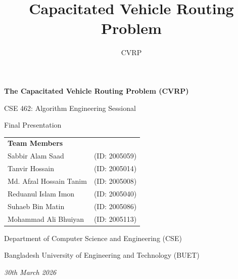 \documentclass{beamer}
\title{Capacitated Vehicle Routing Problem}
\subtitle{CVRP}
\author{}
\date{}
\begin{document}
\begin{frame}
\begin{center}
\vspace{0.3cm}

\vspace{0.3cm}
{\Large\textbf{\textcolor{primaryblue}{The Capacitated Vehicle Routing Problem (CVRP)}}}

\vspace{0.3cm}
{\normalsize CSE 462: Algorithm Engineering Sessional}

{\normalsize Final Presentation}


\vspace{0.5cm}
\begin{tabular}{ll}
\textbf{Team Members} & \\
Sabbir Alam Saad & (ID: 2005059) \\
Tanvir Hossain & (ID: 2005014) \\
Md. Afzal Hossain Tanim & (ID: 2005008) \\
Reduanul Islam Imon & (ID: 2005040) \\
Suhaeb Bin Matin & (ID: 2005086) \\
Mohammad Ali Bhuiyan & (ID: 2005113) \\
\end{tabular}

\vspace{0.5cm}
{\small Department of Computer Science and Engineering (CSE)}

{\small Bangladesh University of Engineering and Technology (BUET)}

\vspace{0.3cm}
{\footnotesize\textit{30th March 2026}}
\end{center}
\end{frame}
\end{document}
